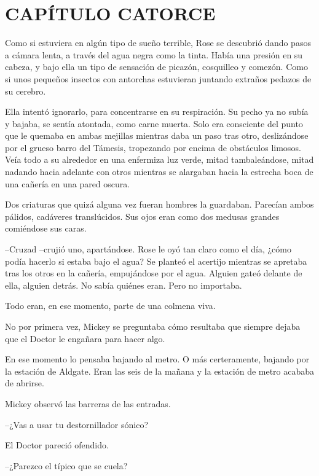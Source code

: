 \chapter*{CAPÍTULO CATORCE}

{Como si estuviera en algún tipo de sueño terrible, Rose se descubrió
 dando pasos a cámara lenta, a través del agua negra como la tinta. Había
 una presión en su cabeza, y bajo ella un tipo de sensación de picazón,
 cosquilleo y comezón. Como si unos pequeños insectos con antorchas
estuvieran juntando extraños pedazos de su cerebro.}

{Ella intentó ignorarlo, para concentrarse en su respiración. Su pecho
 ya no subía y bajaba, se sentía atontada, como carne muerta. Solo era
 consciente del punto que le quemaba en ambas mejillas mientras daba un
 paso tras otro, deslizándose por el grueso barro del Támesis, tropezando
 por encima de obstáculos limosos. Veía todo a su alrededor en una
 enfermiza luz verde, mitad tambaleándose, mitad nadando hacia adelante
 con otros mientras se alargaban hacia la estrecha boca de una cañería en
una pared oscura.}

{Dos criaturas que quizá alguna vez fueran hombres la guardaban.
 Parecían ambos pálidos, cadáveres translúcidos. Sus ojos eran como dos
medusas grandes comiéndose sus caras.}

{--Cruzad --crujió uno, apartándose. Rose le oyó tan claro como el día,
 ¿cómo podía hacerlo si estaba bajo el agua? Se planteó el acertijo
 mientras se apretaba tras los otros en la cañería, empujándose por el
 agua. Alguien gateó delante de ella, alguien detrás. No sabía quiénes
eran. Pero no importaba.}

{Todo eran, en ese momento, parte de una colmena viva.}

\mbox{}

{No por primera vez, Mickey se preguntaba cómo resultaba que siempre
dejaba que el Doctor le engañara para hacer algo.}

{En ese momento lo pensaba bajando al metro. O más certeramente, bajando
 por la estación de Aldgate. Eran las seis de la mañana y la estación de
metro acababa de abrirse.}

{Mickey observó las barreras de las entradas.}

{--¿Vas a usar tu destornillador sónico?}

{El Doctor pareció ofendido.}

{--¿Parezco el típico que se cuela?}

